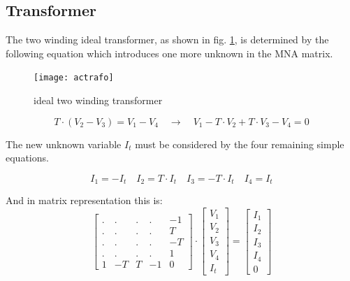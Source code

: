 \documentclass[10pt]{report}
\begin{document}
\subsection{Transformer}

The two winding ideal transformer, as shown in fig.
\ref{fig:actrafo}, is determined by the following equation which
introduces one more unknown in the MNA matrix.

\begin{figure}[ht]
\begin{center}
\texttt{[image: actrafo]}
\end{center}
\caption{ideal two winding transformer}
\label{fig:actrafo}
\end{figure}
\FloatBarrier

\begin{equation}
T\cdot\left(V_{2} - V_{3}\right) = V_{1} -V_{4}
\quad \rightarrow \quad
V_{1} - T\cdot V_{2} + T\cdot V_{3} - V_{4} = 0
\label{eq:trafo}
\end{equation}

The new unknown variable $I_{t}$ must be considered by the four
remaining simple equations.

\begin{equation}
I_{1} = -I_{t} \quad I_{2} = T\cdot I_{t} \quad I_{3} = -T\cdot I_{t} \quad I_{4} = I_{t}
\end{equation}

And in matrix representation this is:
\begin{equation}
\begin{bmatrix}
.&.&.&.& -1\\
.&.&.&.& T\\
.&.&.&.& -T\\
.&.&.&.& 1\\
1 & -T & T & -1 & 0
\end{bmatrix}
\cdot
\begin{bmatrix}
V_{1}\\
V_{2}\\
V_{3}\\
V_{4}\\
I_{t}
\end{bmatrix}
=
\begin{bmatrix}
I_{1}\\
I_{2}\\
I_{3}\\
I_{4}\\
0
\end{bmatrix}
\end{equation}
\end{document}
